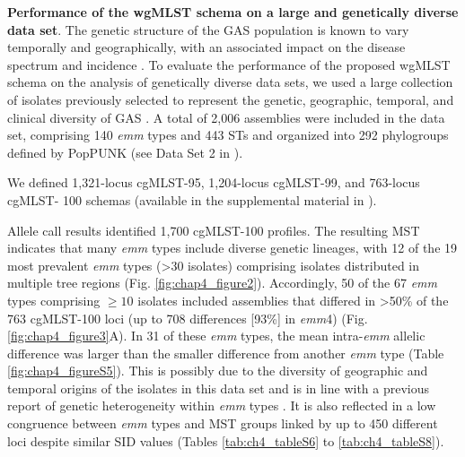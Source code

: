 \textbf{Performance of the wgMLST schema on a large and genetically diverse data set}. The genetic structure of the \ac{GAS} population is known to vary temporally and geographically, with an associated impact on the disease spectrum and incidence \cite{steer_global_2009, barnett_fall_2018}. To evaluate the performance of the proposed \ac{wgMLST} schema on the analysis of genetically diverse data sets, we used a large collection of isolates previously selected to represent the genetic, geographic, temporal, and clinical diversity of \ac{GAS} \cite{davies_atlas_2019}. A total of 2,006 assemblies were included in the data set, comprising 140 \textit{emm} types and 443 \ac{ST}s and organized into 292 phylogroups deﬁned by \ac{PopPUNK} \cite{davies_atlas_2019, lees_fast_2019} (see Data Set 2 in \cite{friaes_supplemental_2023}).

We deﬁned 1,321-locus cgMLST-95, 1,204-locus cgMLST-99, and 763-locus cgMLST- 100 schemas (available in the supplemental material in \cite{friaes_supplemental_2023}).

Allele call results identiﬁed 1,700 cgMLST-100 proﬁles. The resulting \ac{MST} indicates that many \textit{emm} types include diverse genetic lineages, with 12 of the 19 most prevalent \textit{emm} types (>30 isolates) comprising isolates distributed in multiple tree regions (Fig. \ref{fig:chap4_figure2}). Accordingly, 50 of the 67 \textit{emm} types comprising $\geq10$ isolates included assemblies that differed in >50\% of the 763 cgMLST-100 loci (up to 708 differences [93\%] in \textit{emm}4) (Fig. \ref{fig:chap4_figure3}A). In 31 of these \textit{emm} types, the mean intra-\textit{emm} allelic difference was larger than the smaller difference from another \textit{emm} type (Table \ref{fig:chap4_figureS5}). This is possibly due to the diversity of geographic and temporal origins of the isolates in this data set and is in line with a previous report of genetic heterogeneity within \textit{emm} types \cite{davies_atlas_2019}. It is also reﬂected in a low congruence between \textit{emm} types and \ac{MST} groups linked by up to 450 different loci despite similar \ac{SID} values (Tables \ref{tab:ch4_tableS6} to \ref{tab:ch4_tableS8}).


